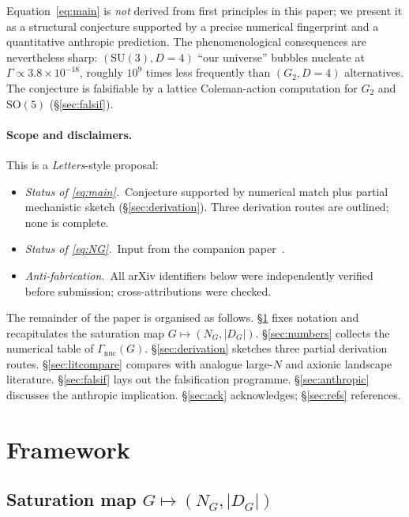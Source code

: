 \documentclass[11pt,a4paper]{article}
\theoremstyle{plain}
\theoremstyle{definition}
\newcommand{\SU}{\mathrm{SU}}
\newcommand{\SO}{\mathrm{SO}}
\newcommand{\nuc}{\mathrm{nuc}}
\begin{document}
Equation~\eqref{eq:main} is \emph{not} derived from first principles in this paper; we present it as a structural conjecture supported by a precise numerical fingerprint and a quantitative anthropic prediction. The phenomenological consequences are nevertheless sharp: $(\SU(3),D{=}4)$ ``our universe'' bubbles nucleate at $\Gamma\propto 3.8\times 10^{-18}$, roughly $10^9$ times less frequently than $(G_2,D{=}4)$ alternatives. The conjecture is falsifiable by a lattice Coleman-action computation for $G_2$ and $\SO(5)$ (\S\ref{sec:falsif}).

\paragraph{Scope and disclaimers.} This is a \emph{Letters}-style proposal:
\begin{itemize}
\setlength\itemsep{0pt}
\item \emph{Status of \eqref{eq:main}.}~Conjecture supported by numerical match plus partial mechanistic sketch (\S\ref{sec:derivation}). Three derivation routes are outlined; none is complete.
\item \emph{Status of \eqref{eq:NG}.}~Input from the companion paper~\cite{Companion1}.
\item \emph{Anti-fabrication.}~All arXiv identifiers below were independently verified before submission; cross-attributions were checked.
\end{itemize}

The remainder of the paper is organised as follows. \S\ref{sec:framework} fixes notation and recapitulates the saturation map $G\mapsto(N_G,|D_G|)$. \S\ref{sec:numbers} collects the numerical table of $\Gamma_{\nuc}(G)$. \S\ref{sec:derivation} sketches three partial derivation routes. \S\ref{sec:litcompare} compares with analogue large-$N$ and axionic landscape literature. \S\ref{sec:falsif} lays out the falsification programme. \S\ref{sec:anthropic} discusses the anthropic implication. \S\ref{sec:ack} acknowledges; \S\ref{sec:refs} references.

\section{Framework}\label{sec:framework}

\subsection{Saturation map $G\mapsto(N_G,|D_G|)$}
\end{document}
